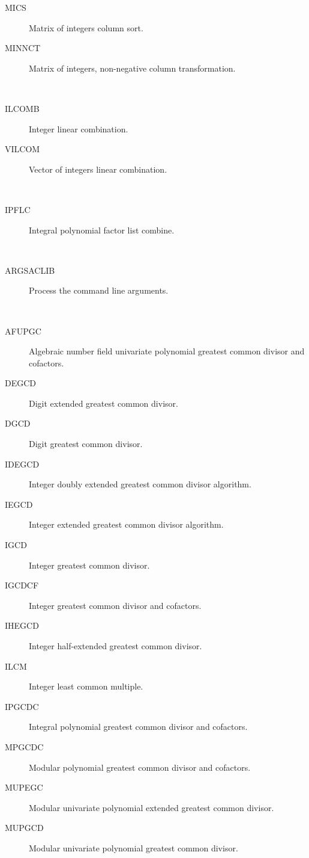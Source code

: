 \begin{description}
\begin{description}
  \item[MICS]  Matrix of integers column sort.
  \item[MINNCT]  Matrix of integers, non-negative column transformation.
  \end{description}
\item[combination] \ \ 
  \begin{description}
  \item[ILCOMB]  Integer linear combination.
  \item[VILCOM]  Vector of integers linear combination.
  \end{description}
\item[combine] \ \ 
  \begin{description}
  \item[IPFLC]  Integral polynomial factor list combine.
  \end{description}
\item[command] \ \ 
  \begin{description}
  \item[ARGSACLIB]  Process the command line arguments.
  \end{description}
\item[common] \ \ 
  \begin{description}
  \item[AFUPGC]  Algebraic number field univariate polynomial greatest common
    divisor and cofactors.
  \item[DEGCD]  Digit extended greatest common divisor.
  \item[DGCD]  Digit greatest common divisor.
  \item[IDEGCD]  Integer doubly extended greatest common divisor algorithm.
  \item[IEGCD]  Integer extended greatest common divisor algorithm.
  \item[IGCD]  Integer greatest common divisor.
  \item[IGCDCF]  Integer greatest common divisor and cofactors.
  \item[IHEGCD]  Integer half-extended greatest common divisor.
  \item[ILCM]  Integer least common multiple.
  \item[IPGCDC]  Integral polynomial greatest common divisor and cofactors.
  \item[MPGCDC]  Modular polynomial greatest common divisor and cofactors.
  \item[MUPEGC]  Modular univariate polynomial extended greatest common
    divisor.
  \item[MUPGCD]  Modular univariate polynomial greatest common divisor.

\end{description}
\end{description}
